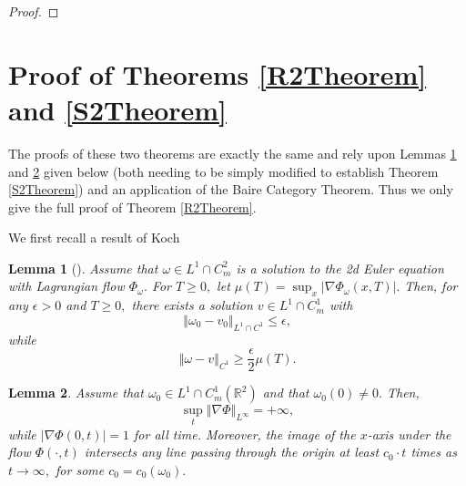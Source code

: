 \documentclass[10pt]{article}
\numberwithin{equation}{section}
\theoremstyle{plain}
\newtheorem{lemma}{Lemma}[section]
\theoremstyle{definition}
\newcommand{\norm}[1]{\left\Vert #1 \right\Vert}
\numberwithin{equation}{section}
\begin{document}
\begin{proof}
\end{proof}



\section{Proof of Theorems \ref{R2Theorem} and \ref{S2Theorem}}
The proofs of these two theorems are exactly the same and rely upon Lemmas \ref{Koch} and \ref{LagrangianChaos} given below (both needing to be simply modified to establish Theorem \ref{S2Theorem}) and an application of the Baire Category Theorem. Thus we only give the full proof of Theorem \ref{R2Theorem}.

We first recall a result of Koch
\begin{lemma}[\cite{Koch}]\label{Koch}
Assume that $\omega\in L^1\cap C^2_m$ is a solution to the 2d Euler equation with Lagrangian flow $\Phi_\omega.$ For $T\geq 0,$ let $\mu(T)=\sup_{x}|\nabla \Phi_\omega(x,T)|.$ Then, for any $\epsilon>0$ and $T\geq 0,$ there exists a solution $v\in L^1\cap C^1_m$ with 
\[\norm{\omega_0-v_0}_{L^1\cap C^1}\leq \epsilon,\] while 
\[\norm{\omega-v}_{C^1}\geq \frac{\epsilon}{2} \mu(T).\]
\end{lemma}

\begin{lemma}\label{LagrangianChaos}
Assume that $\omega_0\in L^1\cap C^1_{m}(\mathbb{R}^2)$ and that $\omega_0(0)\not=0.$ Then, \[\sup_{t}\norm{\nabla\Phi}_{L^\infty}=+\infty,\] while $|\nabla\Phi(0,t)|=1$ for all time. Moreover, the image of the $x$-axis under the flow $\Phi(\cdot,t)$ intersects any line passing through the origin at least $c_0\cdot t$ times as $t\rightarrow\infty,$ for some $c_0=c_0(\omega_0).$ 
\end{lemma}
\end{document}

